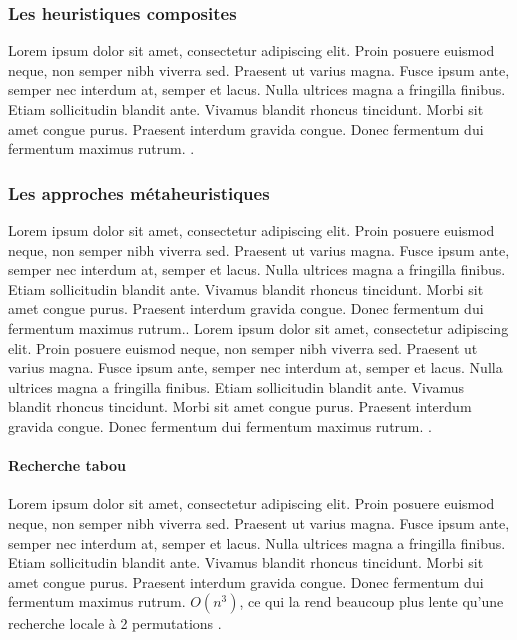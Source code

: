 \medskip

\subsubsection{Les heuristiques composites}
Lorem ipsum dolor sit amet, consectetur adipiscing elit. Proin posuere euismod neque, non semper nibh viverra sed. Praesent ut varius magna. Fusce ipsum ante, semper nec interdum at, semper et lacus. Nulla ultrices magna a fringilla finibus. Etiam sollicitudin blandit ante. Vivamus blandit rhoncus tincidunt. Morbi sit amet congue purus. Praesent interdum gravida congue. Donec fermentum dui fermentum maximus rutrum. \parencite{golden_approximate_1980}.

\subsubsection{Les approches métaheuristiques}
Lorem ipsum dolor sit amet, consectetur adipiscing elit. Proin posuere euismod neque, non semper nibh viverra sed. Praesent ut varius magna. Fusce ipsum ante, semper nec interdum at, semper et lacus. Nulla ultrices magna a fringilla finibus. Etiam sollicitudin blandit ante. Vivamus blandit rhoncus tincidunt. Morbi sit amet congue purus. Praesent interdum gravida congue. Donec fermentum dui fermentum maximus rutrum.\parencite{blum_metaheuristics_2003}. Lorem ipsum dolor sit amet, consectetur adipiscing elit. Proin posuere euismod neque, non semper nibh viverra sed. Praesent ut varius magna. Fusce ipsum ante, semper nec interdum at, semper et lacus. Nulla ultrices magna a fringilla finibus. Etiam sollicitudin blandit ante. Vivamus blandit rhoncus tincidunt. Morbi sit amet congue purus. Praesent interdum gravida congue. Donec fermentum dui fermentum maximus rutrum. \parencite{bianchi_survey_2009}.

\medskip

\paragraph{Recherche tabou}
Lorem ipsum dolor sit amet, consectetur adipiscing elit. Proin posuere euismod neque, non semper nibh viverra sed. Praesent ut varius magna. Fusce ipsum ante, semper nec interdum at, semper et lacus. Nulla ultrices magna a fringilla finibus. Etiam sollicitudin blandit ante. Vivamus blandit rhoncus tincidunt. Morbi sit amet congue purus. Praesent interdum gravida congue. Donec fermentum dui fermentum maximus rutrum. $O(n^3)$, ce qui la rend beaucoup plus lente qu'une recherche locale à 2 permutations \parencite{davendra_traveling_2010}.

